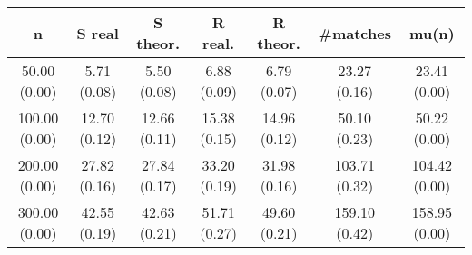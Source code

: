 \begin{center}
\begin{tabular}{c | c | c | c | c | c | c}
n & S real & S theor. & R real. & R theor. & #matches & mu(n)\\ \hline
50.00 (0.00) & 5.71 (0.08) & 5.50 (0.08) & 6.88 (0.09) & 6.79 (0.07) & 23.27 (0.16) & 23.41 (0.00) \\
100.00 (0.00) & 12.70 (0.12) & 12.66 (0.11) & 15.38 (0.15) & 14.96 (0.12) & 50.10 (0.23) & 50.22 (0.00) \\
200.00 (0.00) & 27.82 (0.16) & 27.84 (0.17) & 33.20 (0.19) & 31.98 (0.16) & 103.71 (0.32) & 104.42 (0.00) \\
300.00 (0.00) & 42.55 (0.19) & 42.63 (0.21) & 51.71 (0.27) & 49.60 (0.21) & 159.10 (0.42) & 158.95 (0.00) \\
\end{tabular}
\end{center}
